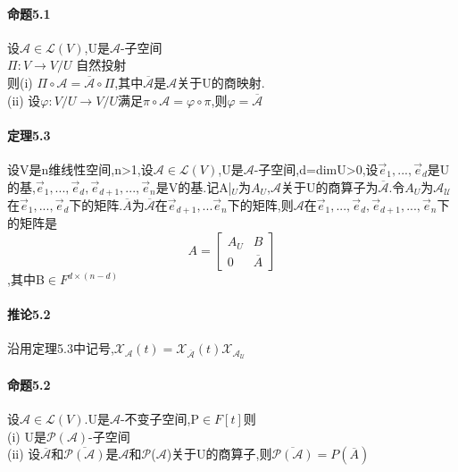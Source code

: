 \documentclass{ctexart}
\begin{document}
\paragraph{命题5.1}
设$\mathcal{A}\in\mathcal{L}(V)$,U是$\mathcal{A}$-子空间\\
$\Pi : V \to V/U$ 自然投射\\
则(i)  $\Pi \circ \mathcal{A} = \overline{\mathcal{A}} \circ \Pi$,其中$\overline{\mathcal{A}}$是$\mathcal{A}$关于U的商映射.\\
(ii) 设$\varphi : V/U \to V/U$满足$\pi \circ \mathcal{A} = \varphi \circ \pi$,则$\varphi = \overline{\mathcal{A}}$

\paragraph{定理5.3}
设V是n维线性空间,n>1,设$\mathcal{A}\in \mathcal{L}(V)$,U是$\mathcal{A}$-子空间,d=dimU>0,设$\vec{e}_{1},...,\vec{e}_{d}$是U的基,$\vec{e}_{1},...,\vec{e}_{d},\vec{e}_{d+1},...,\vec{e}_{n}$是V的基.记A|$_{U}$为$A_{U}$,$\mathcal{A}$关于U的商算子为$\overline{\mathcal{A}}$.令$A_{U}$为$\mathcal{A_{U}}$在$\vec{e}_{1},...,\vec{e}_{d}$下的矩阵.$\overline{A}$为$\overline{\mathcal{A}}$在$\vec{e}_{d+1},...\vec{e}_{n}$下的矩阵,则$\mathcal{A}$在$\vec{e}_{1},...,\vec{e}_{d},\vec{e}_{d+1},...,\vec{e}_{n}$下的矩阵是\\
\begin{equation}
A=
\left[ \begin{array}{cc}
A_{U} & B\\
0 & \overline{A}
\end{array} 
\right]
\end{equation},其中B$\in F^{d\times(n-d)}$

\paragraph{推论5.2}
沿用定理5.3中记号,$\mathcal{X_{\mathcal{A}}}(t)=\mathcal{X_{\overline{A}}}(t)\mathcal{X_{\mathcal{A_{U}}}}$

\paragraph{命题5.2}
设$\mathcal{A}\in\mathcal{L}(V)$.U是$\mathcal{A}$-不变子空间,P$\in F[t]$则\\
(i) U是$\mathcal{P}(\mathcal{A})$-子空间\\
(ii) 设$\overline{\mathcal{A}}$和$\mathcal{\overline{P(\mathcal{A})}}$是$\mathcal{A}$和$\mathcal{P}$($\mathcal{A}$)关于U的商算子,则$\overline{\mathcal{P}(\mathcal{A})}=P(\overline{A})$
\end{document}
